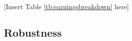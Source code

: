 \documentclass[reviewmode,AEJ]{AEA}
\begin{document}
\begin{center}
	[Insert Table \ref{tb:earningsbreakdown} here]
\end{center}








\subsection{Robustness}
\end{document}
